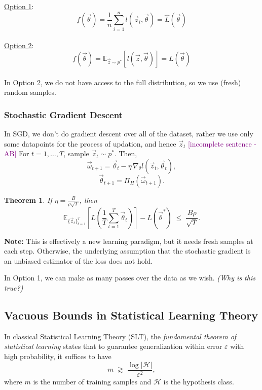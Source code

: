 \documentclass[11pt]{article}
\newcommand{\ab}[1]{\textcolor{purple}{[#1 - AB]}}
\theoremstyle{plain}
\newtheorem{theorem}{Theorem}[section]
\begin{document}
\underline{Option 1}:
\[
f(\vec{\theta}) = \frac{1}{n} \sum_{i=1}^{n} l(\vec{z}_i, \vec{\theta}) = \hat{L}(\vec{\theta})
\]
\\
\underline{Option 2}:
\[
f(\vec{\theta}) = \mathbb{E}_{\vec{z} \sim p^*} \left[ l(\vec{z}, \vec{\theta}) \right] = L(\vec{\theta})
\]\\

In Option 2, we do not have access to the full distribution, so we use (fresh) random samples.

\subsubsection{Stochastic Gradient Descent}
In SGD, we don't do gradient descent over all of the dataset, rather we use only
some datapoints for the process of updation, and hence $\vec{z}_t$
\ab{incomplete sentence} For $t = 1, \dots, T$, sample $\vec{z}_t \sim p^*$.  
Then,
\[
\vec{\omega}_{t+1} = \vec{\theta}_t - \eta \, \nabla_\theta l(\vec{z}_t, \vec{\theta}_t),
\]
\[
\vec{\theta}_{t+1} = \Pi_H(\vec{\omega}_{t+1}).
\]

\begin{theorem}
If $\eta = \frac{B}{\rho \sqrt{T}}$, then
\[
\mathbb{E}_{\{\vec{z}_t\}_{t=1}^T} \left[ L\!\left( \frac{1}{T} \sum_{t=1}^T \vec{\theta}_t \right) \right]
- L(\vec{\theta}^*)
\;\le\; \frac{B\rho}{\sqrt{T}}.
\]
\end{theorem}

\noindent\textbf{Note:} This is effectively a new learning paradigm, but it needs fresh samples at each step.  
Otherwise, the underlying assumption that the stochastic gradient is an unbiased estimator of the loss does not hold.

\medskip
\noindent 
In Option 1, we can make as many passes over the data as we wish. \textit{(Why is this true?)} 

\subsection{Vacuous Bounds in Statistical Learning Theory}

In classical Statistical Learning Theory (SLT), the \textit{fundamental theorem of statistical learning} states that to guarantee generalization within error $\varepsilon$ with high probability, it suffices to have
\[
m \;\gtrsim\; \frac{\log |\mathcal{H}|}{\varepsilon^2},
\]
where $m$ is the number of training samples and $\mathcal{H}$ is the hypothesis class.
\end{document}

